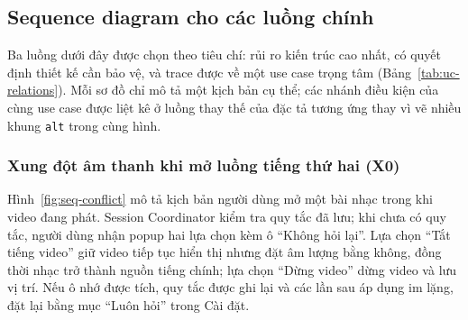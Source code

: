 \subsection{Sequence diagram cho các luồng chính}
\label{sec:sequence-flows}

Ba luồng dưới đây được chọn theo tiêu chí: rủi ro kiến trúc cao nhất, có quyết định thiết kế cần bảo vệ, và trace được về một use case trọng tâm (Bảng~\ref{tab:uc-relations}). Mỗi sơ đồ chỉ mô tả một kịch bản cụ thể; các nhánh điều kiện của cùng use case được liệt kê ở luồng thay thế của đặc tả tương ứng thay vì vẽ nhiều khung \texttt{alt} trong cùng hình.

\subsubsection{Xung đột âm thanh khi mở luồng tiếng thứ hai (X0)}
\label{sec:seq-conflict}

Hình~\ref{fig:seq-conflict} mô tả kịch bản người dùng mở một bài nhạc trong khi video đang phát. Session Coordinator kiểm tra quy tắc đã lưu; khi chưa có quy tắc, người dùng nhận popup hai lựa chọn kèm ô ``Không hỏi lại''. Lựa chọn ``Tắt tiếng video'' giữ video tiếp tục hiển thị nhưng đặt âm lượng bằng không, đồng thời nhạc trở thành nguồn tiếng chính; lựa chọn ``Dừng video'' dừng video và lưu vị trí. Nếu ô nhớ được tích, quy tắc được ghi lại và các lần sau áp dụng im lặng, đặt lại bằng mục ``Luôn hỏi'' trong Cài đặt.

